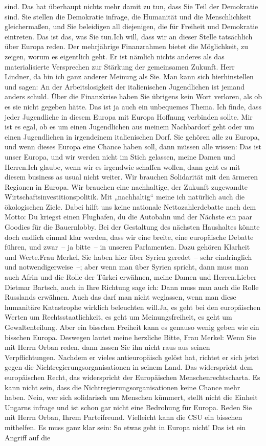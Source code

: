 \documentclass{article}
\begin{document}
sind. Das hat überhaupt nichts mehr damit zu tun, dass Sie Teil der Demokratie sind. Sie stellen die Demokratie infrage, die Humanität und die Menschlichkeit gleichermaßen, und Sie beleidigen all diejenigen, die für Freiheit und Demokratie eintreten. Das ist das, was Sie tun.Ich will, dass wir an dieser Stelle tatsächlich über Europa reden. Der mehrjährige Finanzrahmen bietet die Möglichkeit, zu zeigen, worum es eigentlich geht. Er ist nämlich nichts anderes als das materialisierte Versprechen zur Stärkung der gemeinsamen Zukunft. Herr Lindner, da bin ich ganz anderer Meinung als Sie. Man kann sich hierhinstellen und sagen: An der Arbeitslosigkeit der italienischen Jugendlichen ist jemand anders schuld. Über die Finanzkrise haben Sie übrigens kein Wort verloren, als ob es sie nicht gegeben hätte. Das ist ja auch ein unbequemes Thema. Ich finde, dass jeder Jugendliche in diesem Europa mit Europa Hoffnung verbinden sollte. Mir ist es egal, ob es um einen Jugendlichen aus meinem Nachbardorf geht oder um einen Jugendlichen in irgendeinem italienischen Dorf. Sie gehören alle zu Europa, und wenn dieses Europa eine Chance haben soll, dann müssen alle wissen: Das ist unser Europa, und wir werden nicht im Stich gelassen, meine Damen und Herren.Ich glaube, wenn wir es irgendwie schaffen wollen, dann geht es mit diesem business as usual nicht weiter. Wir brauchen Solidarität mit den ärmeren Regionen in Europa. Wir brauchen eine nachhaltige, der Zukunft zugewandte Wirtschaftsinvestitionspolitik. Mit „nachhaltig“ meine ich natürlich auch die ökologischen Ziele. Dabei hilft uns keine nationale Nettozahlerdebatte nach dem Motto: Du kriegst einen Flughafen, du die Autobahn und der Nächste ein paar Goodies für die Bauernlobby. Bei der Gestaltung des nächsten Haushaltes könnte doch endlich einmal klar werden, dass wir eine breite, eine europäische Debatte führen, und zwar – ja bitte – in unseren Parlamenten. Dazu gehören Klarheit und Werte.Frau Merkel, Sie haben hier über Syrien geredet – sehr eindringlich und notwendigerweise –; aber wenn man über Syrien spricht, dann muss man auch Afrin und die Rolle der Türkei erwähnen, meine Damen und Herren.Lieber Dietmar Bartsch, auch in Ihre Richtung sage ich: Dann muss man auch die Rolle Russlands erwähnen. Auch das darf man nicht weglassen, wenn man diese humanitäre Katastrophe wirklich beleuchten will.Ja, es geht bei den europäischen Werten um Rechtsstaatlichkeit, es geht um Meinungsfreiheit, es geht um Gewaltenteilung. Aber ein bisschen Freiheit kann es genauso wenig geben wie ein bisschen Europa. Deswegen lautet meine herzliche Bitte, Frau Merkel: Wenn Sie mit Herrn Orban reden, dann lassen Sie ihn nicht raus aus seinen Verpflichtungen. Nachdem er vieles antieuropäisch gelöst hat, richtet er sich jetzt gegen die Nichtregierungsorganisationen in seinem Land. Das widerspricht dem europäischen Recht, das widerspricht der Europäischen Menschenrechtscharta. Es kann nicht sein, dass die Nichtregierungsorganisationen keine Chance mehr haben. Nein, wer sich solidarisch um Menschen kümmert, stellt nicht die Einheit Ungarns infrage und ist schon gar nicht eine Bedrohung für Europa. Reden Sie mit Herrn Orban, Ihrem Parteifreund. Vielleicht kann die CSU ein bisschen mithelfen. Es muss ganz klar sein: So etwas geht in Europa nicht! Das ist ein Angriff auf die 
\end{document}
